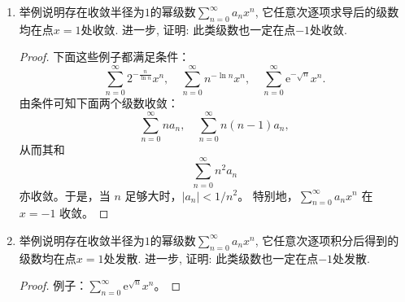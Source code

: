\begin{quizb}
\begin{enumerate}
\item 举例说明存在收敛半径为\(1\)的幂级数\(\sum_{n=0}^{\infty}a_nx^n\), 
它任意次逐项求导后的级数均在点\(x=1\)处收敛. 
进一步, 证明: 此类级数也一定在点\(-1\)处收敛.
\begin{proof}
下面这些例子都满足条件：
\[\sum_{n=0}^{\infty} 2^{-\frac{n}{\ln n}} x^n, \quad \sum_{n=0}^{\infty} n^{-\ln n} x^n, 
\quad \sum_{n=0}^{\infty} \mathrm{e}^{-\sqrt{n}} x^n.\]
由条件可知下面两个级数收敛：
\[\sum_{n=0}^{\infty} n a_n, \quad \sum_{n=0}^{\infty} n(n-1)a_n,\]
从而其和
\[\sum_{n=0}^{\infty} n^2 a_n\]
亦收敛。于是，当 $n$ 足够大时，$|a_n|<1/n^2$。
特别地，\(\sum_{n=0}^{\infty} a_n x^n\) 在 $x=-1$ 收敛。
\end{proof}
\item 举例说明存在收敛半径为\(1\)的幂级数\(\sum_{n=0}^{\infty}a_nx^n\), 
它任意次逐项积分后得到的级数均在点\(x=1\)处发散. 
进一步, 证明: 此类级数也一定在点\(-1\)处发散.
\begin{proof}
例子：\(\sum_{n=0}^{\infty} \mathrm{e}^{\sqrt{n}}x^n\)。


\end{proof}
\end{enumerate}
\end{quizb}
